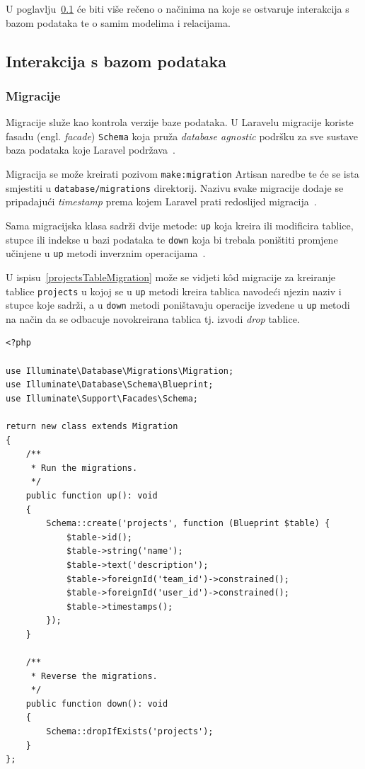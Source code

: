 U poglavlju~\ref{subsection:dbInteraction} će biti više rečeno o načinima na koje se ostvaruje interakcija s bazom podataka te o samim modelima i relacijama.

\subsection{Interakcija s bazom podataka}
\label{subsection:dbInteraction}

\subsubsection{Migracije}
Migracije služe kao kontrola verzije baze podataka. U Laravelu migracije koriste fasadu (engl. \textit{facade}) \texttt{Schema} koja pruža \textit{database agnostic} podršku za sve sustave baza podataka koje Laravel podržava~\cite{migrations}.

Migracija se može kreirati pozivom \texttt{make:migration} Artisan naredbe te će se ista smjestiti u \texttt{database/migrations} direktorij. Nazivu svake migracije dodaje se pripadajući \textit{timestamp} prema kojem Laravel prati redoslijed migracija~\cite{migrations}.

Sama migracijska klasa sadrži dvije metode: \texttt{up} koja kreira ili modificira tablice, stupce ili indekse u bazi podataka te \texttt{down} koja bi trebala poništiti promjene učinjene u \texttt{up} metodi inverznim operacijama~\cite{migrations}.

U ispisu~\ref{projectsTableMigration} može se vidjeti k\^od migracije za kreiranje tablice \texttt{projects} u kojoj se u \texttt{up} metodi kreira tablica navodeći njezin naziv i stupce koje sadrži, a u \texttt{down} metodi poništavaju operacije izvedene u \texttt{up} metodi na način da se odbacuje novokreirana tablica tj. izvodi \textit{drop} tablice.

\begin{lstlisting}[caption={Migracija za kreiranje tablice \texttt{projects}}, label=projectsTableMigration]
<?php

use Illuminate\Database\Migrations\Migration;
use Illuminate\Database\Schema\Blueprint;
use Illuminate\Support\Facades\Schema;

return new class extends Migration
{
    /**
     * Run the migrations.
     */
    public function up(): void
    {
        Schema::create('projects', function (Blueprint $table) {
            $table->id();
            $table->string('name');
            $table->text('description');
            $table->foreignId('team_id')->constrained();
            $table->foreignId('user_id')->constrained();
            $table->timestamps();
        });
    }

    /**
     * Reverse the migrations.
     */
    public function down(): void
    {
        Schema::dropIfExists('projects');
    }
};

\end{lstlisting}

